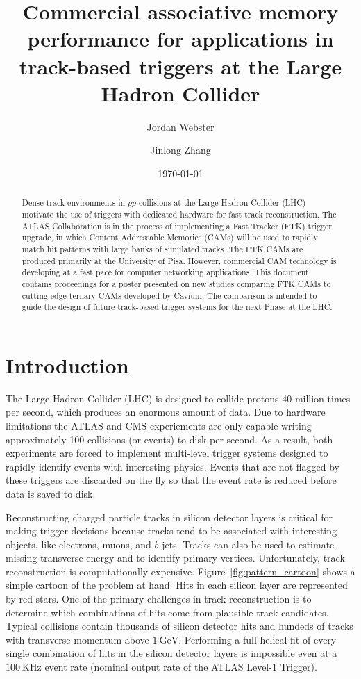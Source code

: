 \documentclass[preprint,prd,showpacs]{revtex4-1}
\newcommand{\gev}{~\mathrm{GeV}}
\newcommand{\khz}{~\mathrm{KHz}}
\begin{document}
\title{Commercial associative memory performance for applications in track-based triggers at the Large Hadron Collider}
\author{Jordan Webster}
\author{Jinlong Zhang}

\date{\today}
\begin{abstract}
  Dense track environments in $pp$ collisions at the Large Hadron Collider (LHC) motivate the use of triggers with dedicated hardware for fast track reconstruction. The ATLAS Collaboration is in the process of implementing a Fast Tracker (FTK) trigger upgrade, in which Content Addressable Memories (CAMs) will be used to rapidly match hit patterns with large banks of simulated tracks. The FTK CAMs are produced primarily at the University of Pisa. However, commercial CAM technology is developing at a fast pace for computer networking applications. This document contains proceedings for a poster presented on new studies comparing FTK CAMs to cutting edge ternary CAMs developed by Cavium. The comparison is intended to guide the design of future track-based trigger systems for the next Phase at the LHC.
\end{abstract}

\maketitle

\section{Introduction}\label{sec:Introduction}

The Large Hadron Collider (LHC) is designed to collide protons 40 million times per second, which produces an enormous amount of data. Due to hardware limitations the ATLAS and CMS experiements are only capable writing approximately 100 collisions (or events) to disk per second. As a result, both experiments are forced to implement multi-level trigger systems designed to rapidly identify events with interesting physics. Events that are not flagged by these triggers are discarded on the fly so that the event rate is reduced before data is saved to disk.

Reconstructing charged particle tracks in silicon detector layers is critical for making trigger decisions because tracks tend to be associated with interesting objects, like electrons, muons, and $b$-jets. Tracks can also be used to estimate missing transverse energy and to identify primary vertices. Unfortunately, track reconstruction is computationally expensive. Figure~\ref{fig:pattern_cartoon} shows a simple cartoon of the problem at hand. Hits in each silicon layer are represented by red stars. One of the primary challenges in track reconstruction is to determine which combinations of hits come from plausible track candidates. Typical collisions contain thousands of silicon detector hits and hundeds of tracks with transverse momentum above $1\gev$. Performing a full helical fit of every single combination of hits in the silicon detector layers is impossible even at a $100\khz$ event rate (nominal output rate of the ATLAS Level-1 Trigger).
\end{document}
